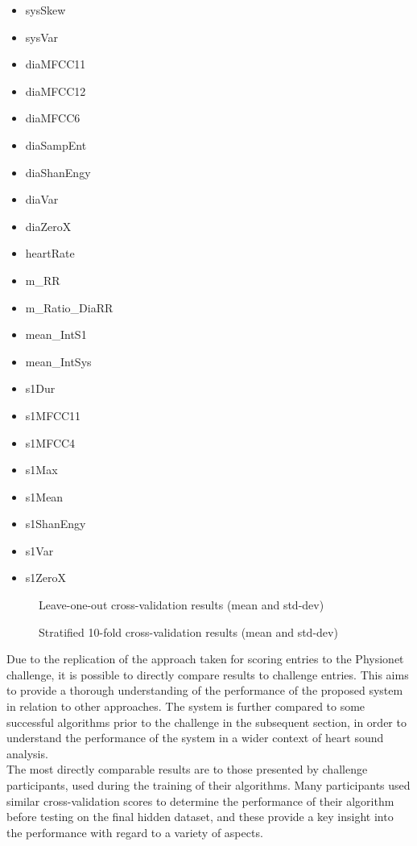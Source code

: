 \documentclass[titlepage, 12pt]{scrartcl} \usepackage{enumitem}
\begin{document}
\begin{table}[H]
\begin{multicols}{5}
\begin{itemize}
    \item sysSkew
    \item sysVar
    \item diaMFCC11
    \item diaMFCC12
    \item diaMFCC6
    \item diaSampEnt
    \item diaShanEngy
    \item diaVar
    \item diaZeroX
    \item heartRate
    \item m\_RR
    \item m\_Ratio\_DiaRR
    \item mean\_IntS1
    \item mean\_IntSys
    \item s1Dur
    \item s1MFCC11
    \item s1MFCC4
    \item s1Max
    \item s1Mean
    \item s1ShanEngy
    \item s1Var
    \item s1ZeroX
\end{itemize}
\end{multicols}
\end{table}
\begin{figure}[H]
    \caption{Leave-one-out cross-validation results (mean and std-dev)}
    \label{fig1}
\end{figure}
\begin{figure}[H]
    \caption{Stratified 10-fold cross-validation results (mean and std-dev)}
    \label{fig2}
\end{figure}
Due to the replication of the approach taken for scoring entries to the Physionet
challenge, it is possible to directly compare results to challenge entries.
This aims to provide a thorough understanding of the performance of the
proposed system in relation to other approaches. The system is further compared
to some successful algorithms prior to the challenge in the subsequent section,
in order to understand the performance of the system in a wider context of
heart sound analysis.\\

The most directly comparable results are to those presented by challenge
participants, used during the training of their algorithms. Many participants
used similar cross-validation scores to determine the performance of their
algorithm before testing on the final hidden dataset, and these provide a key
insight into the performance with regard to a variety of aspects.\\
\end{document}
